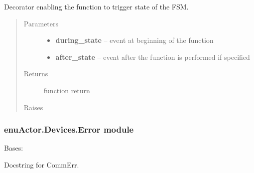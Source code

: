 \documentclass[letterpaper,10pt,english]{sphinxmanual}
\begin{document}
\begin{fulllineitems}
\label{enuActor.Devices:enuActor.Devices.Device.transition}
Decorator enabling the function to trigger state of the FSM.
\begin{quote}\begin{description}
\item[{Parameters}] \leavevmode\begin{itemize}
\item {} 
\textbf{during\_state} -- event at beginning of the function

\item {} 
\textbf{after\_state} -- event after the function is performed if specified

\end{itemize}

\item[{Returns}] \leavevmode
function return

\item[{Raises}] \leavevmode
{\hyperref[enuActor.Devices:enuActor.Devices.Error.DeviceErr]{}}

\end{description}\end{quote}

\end{fulllineitems}



\subsubsection{enuActor.Devices.Error module}
\label{enuActor.Devices:enuactor-devices-error-module}\label{enuActor.Devices:module-enuActor.Devices.Error}

\begin{fulllineitems}
\label{enuActor.Devices:enuActor.Devices.Error.CfgFileErr}
Bases: {\hyperref[enuActor.Devices:enuActor.Devices.Error.RuleError]{}}

Docstring for CommErr.

\end{fulllineitems}

\end{document}
